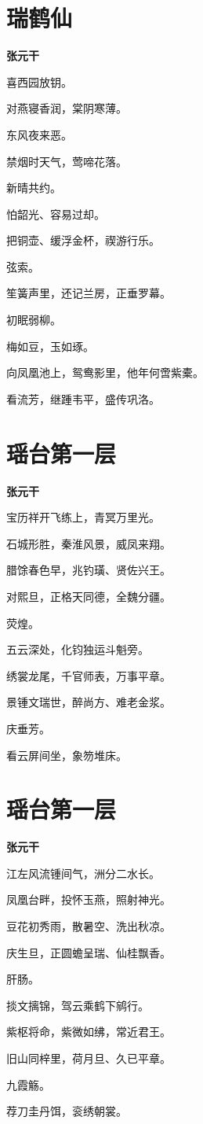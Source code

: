 \documentclass[12pt,a4paper]{ctexbook}
\begin{document}
\section{瑞鹤仙}
\textbf{张元干}\par\vspace{0.5em}
喜西园放钥。\par
对燕寝香润，棠阴寒薄。\par
东风夜来恶。\par
禁烟时天气，莺啼花落。\par
新晴共约。\par
怕韶光、容易过却。\par
把铜壶、缓浮金杯，禊游行乐。\par
弦索。\par
笙簧声里，还记兰房，正垂罗幕。\par
初眠弱柳。\par
梅如豆，玉如琢。\par
向凤凰池上，鸳鸯影里，他年何啻紫橐。\par
看流芳，继踵韦平，盛传巩洛。\par

\section{瑶台第一层}
\textbf{张元干}\par\vspace{0.5em}
宝历祥开飞练上，青冥万里光。\par
石城形胜，秦淮风景，威凤来翔。\par
腊馀春色早，兆钓璜、贤佐兴王。\par
对熙旦，正格天同德，全魏分疆。\par
荧煌。\par
五云深处，化钧独运斗魁旁。\par
绣裳龙尾，千官师表，万事平章。\par
景锺文瑞世，醉尚方、难老金浆。\par
庆垂芳。\par
看云屏间坐，象笏堆床。\par

\section{瑶台第一层}
\textbf{张元干}\par\vspace{0.5em}
江左风流锺间气，洲分二水长。\par
凤凰台畔，投怀玉燕，照射神光。\par
豆花初秀雨，散暑空、洗出秋凉。\par
庆生旦，正圆蟾呈瑞、仙桂飘香。\par
肝肠。\par
掞文摛锦，驾云乘鹤下鹓行。\par
紫枢将命，紫微如绋，常近君王。\par
旧山同梓里，荷月旦、久已平章。\par
九霞觞。\par
荐刀圭丹饵，衮绣朝裳。\par
\end{document}
